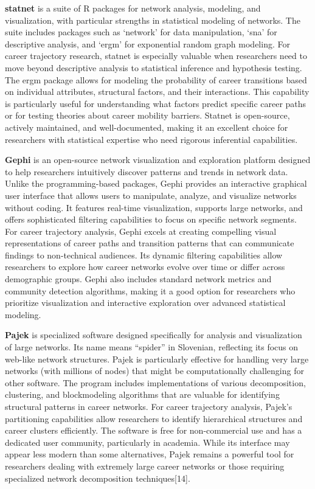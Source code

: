 \documentclass[
  letterpaper,
  DIV=11,
  numbers=noendperiod]{scrartcl}
\begin{document}
\textbf{statnet} is a suite of R packages for network analysis,
modeling, and visualization, with particular strengths in statistical
modeling of networks. The suite includes packages such as `network' for
data manipulation, `sna' for descriptive analysis, and `ergm' for
exponential random graph modeling. For career trajectory research,
statnet is especially valuable when researchers need to move beyond
descriptive analysis to statistical inference and hypothesis testing.
The ergm package allows for modeling the probability of career
transitions based on individual attributes, structural factors, and
their interactions. This capability is particularly useful for
understanding what factors predict specific career paths or for testing
theories about career mobility barriers. Statnet is open-source,
actively maintained, and well-documented, making it an excellent choice
for researchers with statistical expertise who need rigorous inferential
capabilities.

\textbf{Gephi} is an open-source network visualization and exploration
platform designed to help researchers intuitively discover patterns and
trends in network data. Unlike the programming-based packages, Gephi
provides an interactive graphical user interface that allows users to
manipulate, analyze, and visualize networks without coding. It features
real-time visualization, supports large networks, and offers
sophisticated filtering capabilities to focus on specific network
segments. For career trajectory analysis, Gephi excels at creating
compelling visual representations of career paths and transition
patterns that can communicate findings to non-technical audiences. Its
dynamic filtering capabilities allow researchers to explore how career
networks evolve over time or differ across demographic groups. Gephi
also includes standard network metrics and community detection
algorithms, making it a good option for researchers who prioritize
visualization and interactive exploration over advanced statistical
modeling.

\textbf{Pajek} is specialized software designed specifically for
analysis and visualization of large networks. Its name means ``spider''
in Slovenian, reflecting its focus on web-like network structures. Pajek
is particularly effective for handling very large networks (with
millions of nodes) that might be computationally challenging for other
software. The program includes implementations of various decomposition,
clustering, and blockmodeling algorithms that are valuable for
identifying structural patterns in career networks. For career
trajectory analysis, Pajek's partitioning capabilities allow researchers
to identify hierarchical structures and career clusters efficiently. The
software is free for non-commercial use and has a dedicated user
community, particularly in academia. While its interface may appear less
modern than some alternatives, Pajek remains a powerful tool for
researchers dealing with extremely large career networks or those
requiring specialized network decomposition techniques{[}14{]}.
\end{document}
